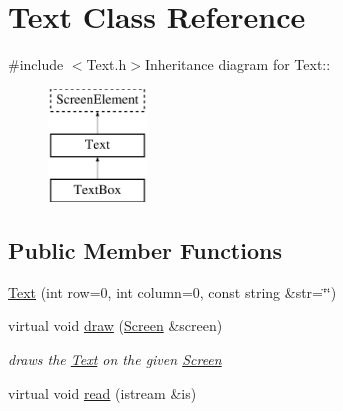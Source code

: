 \hypertarget{classText}{
\section{Text Class Reference}
\label{classText}
}


{\ttfamily \#include $<$Text.h$>$}Inheritance diagram for Text::\begin{figure}[H]
\begin{center}
\leavevmode
\includegraphics[height=3cm]{classText}
\end{center}
\end{figure}
\subsection*{Public Member Functions}
\begin{DoxyCompactItemize}
\item 
\hyperlink{classText_a1c798d677585c623ce9cd6b9d874cafe}{Text} (int row=0, int column=0, const string \&str=\char`\"{}\char`\"{})
\item 
virtual void \hyperlink{classText_a5fedb2f5b4c40b9cd8965d58716b73f8}{draw} (\hyperlink{classScreen}{Screen} \&screen)
\begin{DoxyCompactList}\small\item\em draws the \hyperlink{classText}{Text} on the given \hyperlink{classScreen}{Screen} \item\end{DoxyCompactList}\item 
virtual void \hyperlink{classText_af326f364609eb7e286ad778accb29db3}{read} (istream \&is)
\end{DoxyCompactItemize}
